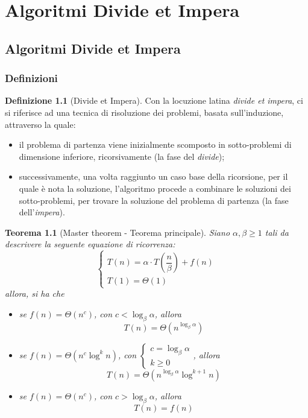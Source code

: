 \documentclass[14pt]{extreport}
\newtheorem{theorem}{Teorema}[subsection]
\theoremstyle{definition}
\newtheorem{definition}{Definizione}[subsection]
\theoremstyle{definition}
\begin{document}
\chapter{Algoritmi Divide et Impera}

\section{Algoritmi Divide et Impera}

\subsection{Definizioni}

\begin{definition}[Divide et Impera]
    Con la locuzione latina \textit{divide et impera}, ci si riferisce ad una tecnica di risoluzione dei problemi, basata sull'induzione, attraverso la quale:

    \begin{itemize} 
        \item il problema di partenza viene inizialmente scomposto in sotto-problemi di dimensione inferiore, ricorsivamente (la fase del \textit{divide});
        \item successivamente, una volta raggiunto un caso base della ricorsione, per il quale è nota la soluzione, l'algoritmo procede a combinare le soluzioni dei sotto-problemi, per trovare la soluzione del problema di partenza (la fase dell'\textit{impera}).
    \end{itemize}
\end{definition}

\begin{theorem}[Master theorem - Teorema principale]
    \label{master theorem}
    Siano $\alpha, \beta \ge 1$ tali da descrivere la seguente equazione di ricorrenza: $$\left \{ \begin{array}{l} T(n) = \alpha \cdot T\left(\dfrac{n}{\beta}\right) + f(n) \\ T(1) = \Theta(1) \end{array} \right.$$ allora, si ha che
    \begin{itemize}
        \item se $f(n) = \Theta(n^c)$, con $c < \log_{\beta}{\alpha}$, allora $$T(n) = \Theta(n^{\log_{\beta}{\alpha}})$$
        \item se $f(n) = \Theta(n^c \log^k n)$, con $\left \{ \begin{array}{l} c = \log_{\beta}{\alpha} \\ k \ge 0 \end{array} \right.$, allora $$T(n) = \Theta(n^{\log_{\beta}{\alpha}} \log^{k+1} {n})$$
        \item se $f(n) = \Theta(n^c)$, con $c > \log_{\beta}{\alpha}$, allora $$T(n) = f(n)$$
    \end{itemize}
\end{theorem}
\end{document}
